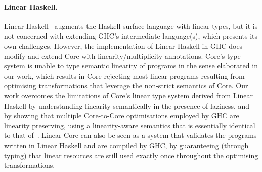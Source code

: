 \documentclass[acmsmall,review,anonymous,screen]{acmart}
\begin{document}
\paragraph{Linear Haskell\label{sec:related-work-linear-haskell}.}
%
%
Linear Haskell~\cite{cite:linearhaskell} augments the Haskell surface language
with linear types, but it is not concerned with extending GHC's intermediate
language(s), which presents its own challenges. 
%
However, the implementation of Linear Haskell in GHC does modify and extend Core
with linearity/multiplicity annotations. Core's type system is unable to type
semantic linearity of programs in the sense elaborated in our work,
which results in Core rejecting most linear programs resulting from optimising
transformations that leverage the non-strict semantics of Core.
%
Our work overcomes the limitations of Core's linear type system derived from
Linear Haskell by understanding linearity semantically in the presence of
laziness, and by showing that multiple Core-to-Core
optimisations employed by GHC are linearity preserving, using a
linearity-aware semantics that is essentially identical to that of~\cite{cite:linearhaskell}.
Linear Core can also be seen as a system that validates the programs written in
Linear Haskell and are compiled by GHC, by guaranteeing (through typing) that
linear resources are still used exactly once throughout the optimising
transformations.
\end{document}
